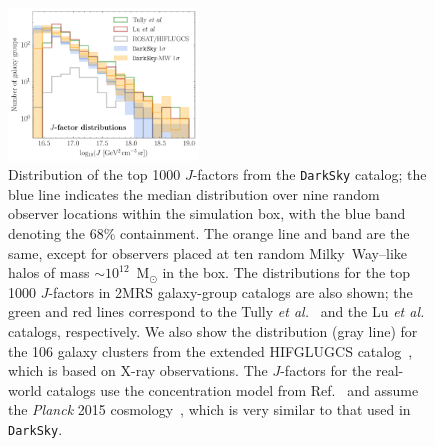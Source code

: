 \begin{figure}[t]
   \centering
   \includegraphics[width=0.45\textwidth]{ch-darksky/plots//cat_jfactors.pdf} 
   \caption{Distribution of the top 1000 $J$-factors from the \texttt{DarkSky} catalog; the blue line  indicates the median distribution over nine random observer locations within the simulation box, with the blue band denoting the 68\% containment.  The orange line and band are the same, except for observers placed at ten random Milky~Way--like halos of mass  $\sim10^{12}$~M$_\odot$ in the box.  The distributions for the top 1000 $J$-factors in 2MRS galaxy-group catalogs are also shown; the green and red lines correspond to the Tully \emph{et al.}~\cite{Tully:2015opa,2017ApJ...843...16K} and the Lu \emph{et al.}~\cite{Lu:2016vmu} catalogs, respectively.  We also show the distribution (gray line) for the 106 galaxy clusters from the extended HIFGLUGCS catalog~\cite{Reiprich:2001zv,Chen:2007sz}, which is based on X-ray observations.  
   The $J$-factors for the real-world catalogs use the concentration model from Ref.~\cite{Correa:2015dva} and assume the \emph{Planck} 2015 cosmology~\cite{Ade:2015xua}, which is very similar to that used in \texttt{DarkSky}.
   }
   \label{fig:GroupCats}
\end{figure}


